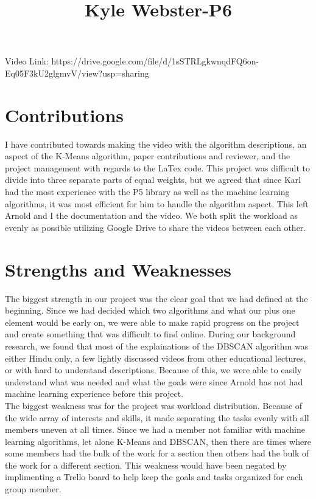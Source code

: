 \documentclass{article}
\title{Kyle Webster-P6}
\begin{document}
\maketitle
Video Link: https://drive.google.com/file/d/1sSTRLgkwnqdFQ6on-Eq05F3kU2glgmvV/view?usp=sharing
\section{Contributions}
I have contributed towards making the video with the algorithm descriptions, an aspect of the K-Means algorithm, paper contributions and reviewer,
and the project management with regards to the LaTex code. This project was difficult to divide into three separate parts of equal weights, but we
agreed that since Karl had the most experience with the P5 library as well as the machine learning algorithms, it was most efficient for him to
handle the algorithm aspect. This left Arnold and I the documentation and the video. We both split the workload as evenly as possible utilizing
Google Drive to share the videos between each other.

\section{Strengths and Weaknesses}
The biggest strength in our project was the clear goal that we had defined at the beginning. Since we had decided which two algorithms and what our
plus one element would be early on, we were able to make rapid progress on the project and create something that was difficult to find online.
During our background research, we found that most of the explainations of the DBSCAN algorithm was either Hindu only, a few lightly discussed videos
from other educational lectures, or with hard to understand descriptions. Because of this, we were able to easily understand what was needed
and what the goals were since Arnold has not had machine learning experience before this project.\\
The biggest weakness was for the project was workload distribution. Because of the wide array of interests and skills, it made separating the
tasks evenly with all members uneven at all times. Since we had a member not familiar with machine learning algorithms, let alone K-Means and DBSCAN,
then there are times where some members had the bulk of the work for a section then others had the bulk of the work for a different section.
This weakness would have been negated by implimenting a Trello board to help keep the goals and tasks organized for each group member.
\end{document}
